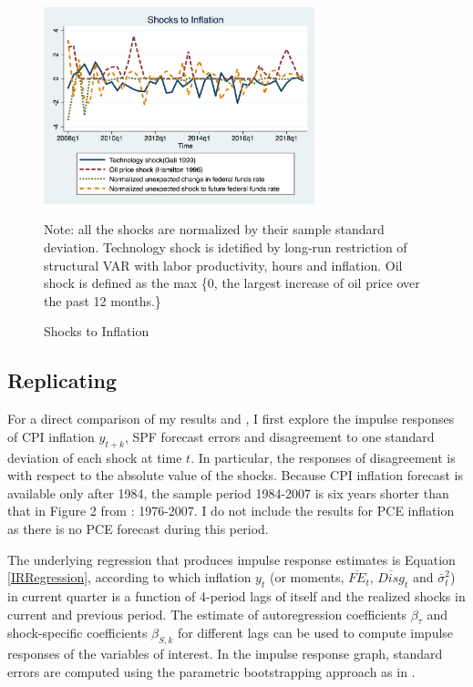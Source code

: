 \documentclass[]{article}
\begin{document}
	\begin{figure}[ht]
		\centering
		\includegraphics[width=0.7\textwidth]{figures/inf_shocksQ.png}
			\begin{flushleft}
			{\footnotesize Note: all the shocks are normalized by their sample standard deviation. Technology shock is idetified by long-run restriction of structural VAR with labor productivity, hours and inflation. Oil shock is defined as the max \{0, the largest increase of oil price over the past 12 months.\} }
		\end{flushleft}
		\caption{ Shocks to Inflation}
		\label{Inflationshocks}
	\end{figure}
	
	\subsection{Replicating \citet{coibion2012can}}
	
	For a direct comparison of my results and \citet{coibion2012can}, I first explore the impulse responses of CPI inflation $y_{t+k}$, SPF forecast errors and disagreement to one standard deviation of each shock at time $t$. In particular, the responses of disagreement is with respect to the absolute value of the shocks. Because CPI inflation forecast is available only after 1984, the sample period 1984-2007 is six years shorter than that in Figure 2 from \citet{coibion2012can}: 1976-2007. I do not include the results for PCE inflation as there is no PCE forecast during this period. 
	
	The underlying regression that produces impulse response estimates is  Equation \ref{IRRegression}, according to which inflation $y_t$ (or moments, $\overline {FE}_{t}$, $\overline{Disg}_t$ and $\bar \sigma^2_t$) in current quarter is a function of 4-period lags of itself and the realized shocks in current and previous period. The estimate of autoregression coefficients $\beta_\tau$ and shock-specific coefficients $\beta_{S,k}$ for different lags can be used to compute impulse responses of the variables of interest. In the impulse response graph, standard errors are computed using the parametric bootstrapping approach as in \citet{coibion2012can}. 
	
\end{document}

